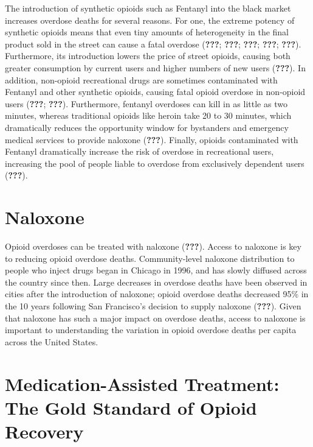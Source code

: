 \documentclass[12pt,twoside]{reedthesis}
\begin{document}
The introduction of synthetic opioids such as Fentanyl into the black market increases overdose deaths for several reasons. For one, the extreme potency of synthetic opioids means that even tiny amounts of heterogeneity in the final product sold in the street can cause a fatal overdose ({\textbf{???}}; {\textbf{???}}; {\textbf{???}}; {\textbf{???}}; {\textbf{???}}). Furthermore, its introduction lowers the price of street opioids, causing both greater consumption by current users and higher numbers of new users ({\textbf{???}}). In addition, non-opioid recreational drugs are sometimes contaminated with Fentanyl and other synthetic opioids, causing fatal opioid overdose in non-opioid users ({\textbf{???}}; {\textbf{???}}). Furthermore, fentanyl overdoses can kill in as little as two minutes, whereas traditional opioids like heroin take 20 to 30 minutes, which dramatically reduces the opportunity window for bystanders and emergency medical services to provide naloxone ({\textbf{???}}). Finally, opioids contaminated with Fentanyl dramatically increase the risk of overdose in recreational users, increasing the pool of people liable to overdose from exclusively dependent users ({\textbf{???}}).

\hypertarget{naloxone}{%
\section{Naloxone}\label{naloxone}}

Opioid overdoses can be treated with naloxone ({\textbf{???}}). Access to naloxone is key to reducing opioid overdose deaths. Community-level naloxone distribution to people who inject drugs began in Chicago in 1996, and has slowly diffused across the country since then. Large decreases in overdose deaths have been observed in cities after the introduction of naloxone; opioid overdose deaths decreased 95\% in the 10 years following San Francisco's decision to supply naloxone ({\textbf{???}}). Given that naloxone has such a major impact on overdose deaths, access to naloxone is important to understanding the variation in opioid overdose deaths per capita across the United States.

\hypertarget{medication-assisted-treatment-the-gold-standard-of-opioid-recovery}{%
\section{Medication-Assisted Treatment: The Gold Standard of Opioid Recovery}\label{medication-assisted-treatment-the-gold-standard-of-opioid-recovery}}
\end{document}
